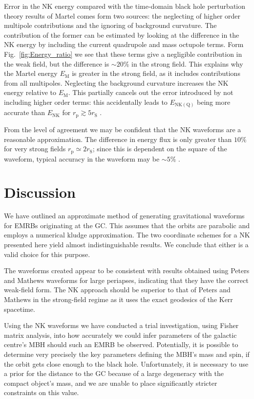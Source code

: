\documentclass[useAMS,usedcolumn,usegraphicx,usenatbib]{mn2e}
\newcommand{\figref}[1]{Fig.~\ref{fig:#1}}
\newcommand{\sub}[1]{\ensuremath{_\mathrm{#1}}}
\begin{document}
Error in the NK energy compared with the time-domain black hole perturbation theory results of Martel comes form two sources: the neglecting of higher order multipole contributions and the ignoring of background curvature. The contribution of the former can be estimated by looking at the difference in the NK energy by including the current quadrupole and mass octupole terms. Form \figref{Energy_ratio} we see that these terms give a negligible contribution in the weak field, but the difference is $\sim20\%$ in the strong field. This explains why the Martel energy $E\sub{M}$ is greater in the strong field, as it includes contributions from all multipoles. Neglecting the background curvature increases the NK energy relative to $E\sub{M}$. This partially cancels out the error introduced by not including higher order terms: this accidentally leads to $E\sub{NK(Q)}$ being more accurate than $E\sub{NK}$ for $r\sub{p} \gtrsim 5 r\sub{S}$ \citep{Tanaka1993}.

From the level of agreement we may be confident that the NK waveforms are a reasonable approximation. The difference in energy flux is only greater than $10\%$ for very strong fields $r\sub{p} \simeq 2 r\sub{S}$; since this is dependent on the square of the waveform, typical accuracy in the waveform may be $\sim 5\%$ \citep{Gair2005,Tanaka1993}.

\section{Discussion}\label{sec:End}

We have outlined an approximate method of generating gravitational waveforms for EMRBs originating at the GC. This assumes that the orbits are parabolic and employs a numerical kludge approximation. The two coordinate schemes for a NK presented here yield almost indistinguishable results. We conclude that either is a valid choice for this purpose.

The waveforms created appear to be consistent with results obtained using Peters and Mathews waveforms for large periapses, indicating that they have the correct weak-field form. The NK approach should be superior to that of Peters and Mathews in the strong-field regime as it uses the exact geodesics of the Kerr spacetime.

Using the NK waveforms we have conducted a trial investigation, using Fisher matrix analysis, into how accurately we could infer parameters of the galactic centre's MBH should such an EMRB be observed. Potentially, it is possible to determine very precisely the key parameters defining the MBH's mass and spin, if the orbit gets close enough to the black hole. Unfortunately, it is necessary to use a prior for the distance to the GC because of a large degeneracy with the compact object's mass, and we are unable to place significantly stricter constraints on this value.
\end{document}
